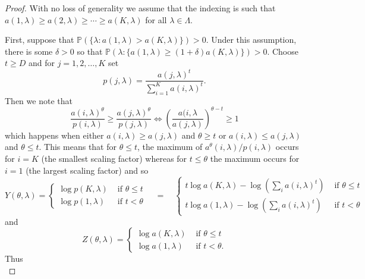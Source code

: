 \documentclass{amsart}
\theoremstyle{plain}
\numberwithin{equation}{section}
\renewcommand{\P}{{\mathbb P}}
\begin{document}
\begin{proof} With no loss of generality we assume that the indexing is such that $a(1,\lambda) \ge a(2,\lambda) \ge \cdots \ge a(K,\lambda)$
for all $\lambda \in \Lambda$.

First, suppose that $\P(\{\lambda :a(1,\lambda)>a(K,\lambda)\})>0$.
Under this assumption, there is some $\delta >0$ so that 
 $\P( \lambda: \{a(1,\lambda)\geq (1+\delta)a(K,\lambda)\})>0$. 
Choose $t\geq D$ and for $j=1,2,\ldots ,K$ set 
\begin{equation}
       p(j,\lambda)=\frac{a(j,\lambda)^t}{\sum_{i=1}^K a(i,\lambda)^t}.
  \label{eq:UpperP}
\end{equation}
Then we note that 
\begin{equation*}
   \frac{a(i,\lambda)^\theta}{p(i,\lambda)}\geq 
              \frac{a(j,\lambda)^\theta}{p(j,\lambda)}\Leftrightarrow \left( \frac{a(i,\lambda}{a(j,\lambda)}\right)^{\theta -t}\geq 1
\end{equation*}
which happens when either $a(i,\lambda)\geq a(j,\lambda)$ and $\theta \geq t$ or $a(i,\lambda)\leq a(j,\lambda)$ and $\theta \leq t$. 
This means that for $\theta \leq t$, the maximum of $a^{\theta}(i,\lambda)/p(i,\lambda)$ occurs for $i=K$ (the smallest scaling factor)
whereas for $t\leq \theta $ the maximum occurs for $i=1$ (the largest scaling factor)
and so 
\begin{equation*}
   Y(\theta,\lambda)=\begin{cases}
          \log p(K,\lambda) & \text{ if }\theta \leq t \\ 
          \log p(1,\lambda) & \text{ if }t<\theta 
             \end{cases} 
       \quad =\quad 
    \begin{cases}
             t\log a(K,\lambda)-\log (\sum_{i}a(i,\lambda)^{t}) & \text{ if }\theta \leq t \\ 
             t\log a(1,\lambda)-\log (\sum_{i}a(i,\lambda)^{t}) & \text{ if }t<\theta 
    \end{cases}
\end{equation*} 
and 
\begin{equation*}
      Z(\theta,\lambda)=\begin{cases}
            \log a(K,\lambda) & \text{ if }\theta \leq t \\ 
            \log a(1,\lambda) & \text{ if }t<\theta.
      \end{cases}
\end{equation*}
Thus 
\begin{equation*}

\end{equation*}
\end{proof}
\end{document}
